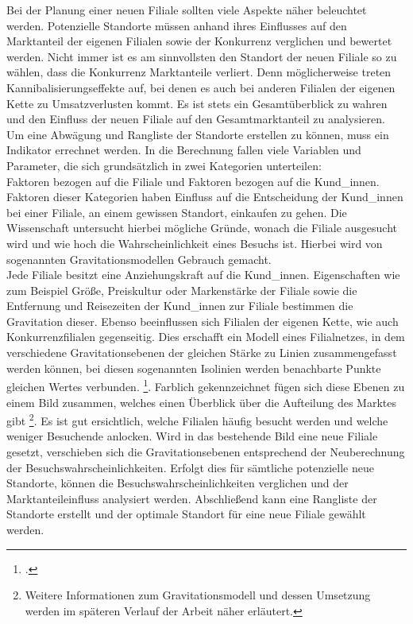 Bei der Planung einer neuen Filiale sollten viele Aspekte näher beleuchtet werden.
Potenzielle Standorte müssen anhand ihres Einflusses auf den Marktanteil der eigenen Filialen sowie der Konkurrenz verglichen und bewertet werden.
Nicht immer ist es am sinnvollsten den Standort der neuen Filiale so zu wählen, dass die Konkurrenz Marktanteile verliert.
Denn möglicherweise treten Kannibalisierungseffekte auf, bei denen es auch bei anderen Filialen der eigenen Kette zu Umsatzverlusten kommt.
Es ist stets ein Gesamtüberblick zu wahren und den Einfluss der neuen Filiale auf den Gesamtmarktanteil zu analysieren.\\
Um eine Abwägung und Rangliste der Standorte erstellen zu können, muss ein Indikator errechnet werden.
In die Berechnung fallen viele Variablen und Parameter, die sich grundsätzlich in zwei Kategorien unterteilen:\\
Faktoren bezogen auf die Filiale und Faktoren bezogen auf die Kund\_innen.
Faktoren dieser Kategorien haben Einfluss auf die Entscheidung der Kund\_innen bei einer Filiale, an einem gewissen Standort, einkaufen zu gehen.
Die Wissenschaft untersucht hierbei mögliche Gründe, wonach die Filiale ausgesucht wird und wie hoch die Wahrscheinlichkeit eines Besuchs ist. 
Hierbei wird von sogenannten Gravitationsmodellen Gebrauch gemacht.\\
Jede Filiale besitzt eine Anziehungskraft auf die Kund\_innen.
Eigenschaften wie zum Beispiel Größe, Preiskultur oder Markenstärke der Filiale sowie die Entfernung und Reisezeiten der Kund\_innen zur Filiale bestimmen die Gravitation dieser.
Ebenso beeinflussen sich Filialen der eigenen Kette, wie auch Konkurrenzfilialen gegenseitig.
Dies erschafft ein Modell eines Filialnetzes, in dem verschiedene Gravitationsebenen der gleichen Stärke zu  Linien zusammengefasst werden können, bei diesen sogenannten Isolinien werden benachbarte Punkte gleichen Wertes verbunden.  \footcite{neumair_definition_2018}.
Farblich gekennzeichnet fügen sich diese Ebenen zu einem Bild zusammen, welches einen Überblick über die Aufteilung des Marktes gibt \footnote{Weitere Informationen zum Gravitationsmodell und dessen Umsetzung werden im späteren Verlauf der Arbeit näher erläutert.}.
Es ist gut ersichtlich, welche Filialen häufig besucht werden und welche weniger Besuchende anlocken.
Wird in das bestehende Bild eine neue Filiale gesetzt, verschieben sich die Gravitationsebenen entsprechend der Neuberechnung der Besuchswahrscheinlichkeiten.
Erfolgt dies für sämtliche potenzielle neue Standorte,  können die Besuchswahrscheinlichkeiten verglichen und der Marktanteileinfluss analysiert werden.
Abschließend kann eine Rangliste der Standorte erstellt und der optimale Standort für eine neue Filiale gewählt werden.

